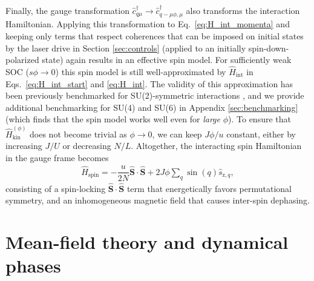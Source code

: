 \documentclass[aps,pra,nofootinbib,twocolumn,superscriptaddress]{revtex4-2}
\renewcommand{\t}{\text} %
\newcommand{\f}[2]{\dfrac{#1}{#2}} %
\newcommand{\p}[1]{\left(#1\right)} %
\newcommand{\1}{\mathds{1}}
\renewcommand{\c}{\hat{c}}
\newcommand{\s}{\hat{s}}
\renewcommand{\H}{\hat{H}}
\renewcommand{\S}{\hat{S}}
\newcommand{\z}{\text{z}}
\newcommand{\spin}{\text{spin}}
\begin{document}
Finally, the gauge transformation $\c_{q\mu}^\dag\to \c_{q-\mu\phi,\mu}^\dag$ also transforms the interaction Hamiltonian.
Applying this transformation to Eq.~\eqref{eq:H_int_momenta} and keeping only terms that respect coherences that can be imposed on initial states by the laser drive in Section \ref{sec:controls} (applied to an initially spin-down-polarized state) again results in an effective spin model.
For sufficiently weak SOC ($s\phi\to0$) this spin model is still well-approximated by $\H_{\t{int}}$ in Eqs.~\eqref{eq:H_int_start} and \eqref{eq:H_int}.
The validity of this approximation has been previously benchmarked for SU(2)-symmetric interactions \cite{he2019engineering, smale2019observation}, and we provide additional benchmarking for SU(4) and SU(6) in Appendix \ref{sec:benchmarking} (which finds that the spin model works well even for {\it large} $\phi$).
To ensure that $\H_{\t{kin}}^{(\phi)}$ does not become trivial as $\phi\to0$, we can keep $J\phi/u$ constant, either by increasing $J/U$ or decreasing $N/L$.
Altogether, the interacting spin Hamiltonian in the gauge frame becomes
\begin{align}
  \H_\spin = -\f{u}{2N} \bm\S\cdot\bm\S + 2J\phi \sum_q \sin\p{q} \s_{\z,q},
  \label{eq:H_spin}
\end{align}
consisting of a spin-locking $\bm\S\cdot\bm\S$ term that energetically favors permutational symmetry, and an inhomogeneous magnetic field that causes inter-spin dephasing.

\section{Mean-field theory and dynamical phases}
\label{sec:mean_field}
\end{document}
